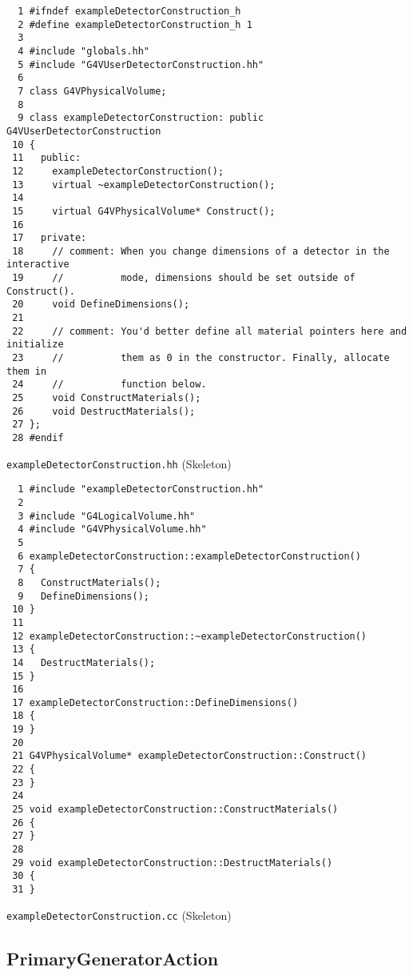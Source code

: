 \begin{code}[p]
\begin{lstlisting}
  1 #ifndef exampleDetectorConstruction_h
  2 #define exampleDetectorConstruction_h 1
  3 
  4 #include "globals.hh"
  5 #include "G4VUserDetectorConstruction.hh"
  6 
  7 class G4VPhysicalVolume;
  8 
  9 class exampleDetectorConstruction: public G4VUserDetectorConstruction
 10 {
 11   public:
 12     exampleDetectorConstruction();
 13     virtual ~exampleDetectorConstruction();
 14 
 15     virtual G4VPhysicalVolume* Construct();
 16 
 17   private:
 18     // comment: When you change dimensions of a detector in the interactive
 19     //          mode, dimensions should be set outside of Construct().
 20     void DefineDimensions();
 21 
 22     // comment: You'd better define all material pointers here and initialize
 23     //          them as 0 in the constructor. Finally, allocate them in
 24     //          function below.
 25     void ConstructMaterials();
 26     void DestructMaterials();
 27 };
 28 #endif
\end{lstlisting}
\caption{\texttt{exampleDetectorConstruction.hh} (Skeleton) \label{code-3-2}}
\end{code}

\begin{code}[p]
\begin{lstlisting}
  1 #include "exampleDetectorConstruction.hh"
  2 
  3 #include "G4LogicalVolume.hh"
  4 #include "G4VPhysicalVolume.hh"
  5 
  6 exampleDetectorConstruction::exampleDetectorConstruction()
  7 {
  8   ConstructMaterials();
  9   DefineDimensions();
 10 }
 11 
 12 exampleDetectorConstruction::~exampleDetectorConstruction()
 13 {
 14   DestructMaterials();
 15 }
 16 
 17 exampleDetectorConstruction::DefineDimensions()
 18 {
 19 }
 20 
 21 G4VPhysicalVolume* exampleDetectorConstruction::Construct()
 22 {
 23 }
 24 
 25 void exampleDetectorConstruction::ConstructMaterials()
 26 {
 27 }
 28 
 29 void exampleDetectorConstruction::DestructMaterials()
 30 {
 31 }
\end{lstlisting}
\caption{\texttt{exampleDetectorConstruction.cc} (Skeleton) \label{code-3-3}}
\end{code}

\newpage
\newpage
\subsection{PrimaryGeneratorAction}

